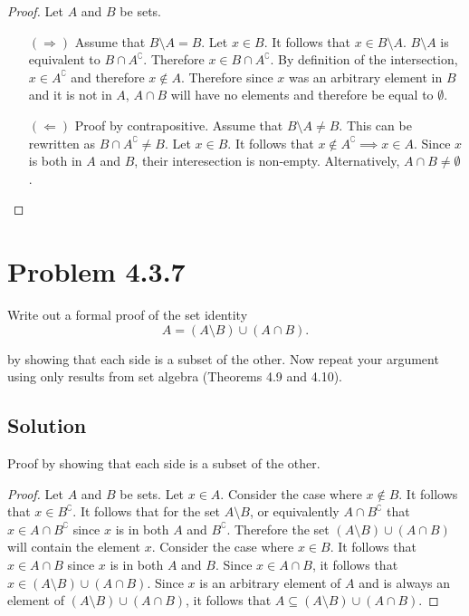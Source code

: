 \documentclass[12pt]{extarticle}
\begin{document}
\begin{proof}
	Let $A$ and $B$ be sets.
	\begin{enumerate}
		\item[$(\Rightarrow)$] 
			Assume that $B \setminus A = B$. Let $x \in B$. It follows that $x \in B \setminus A$. $B \setminus A$ is equivalent to $B \cap A^\complement$. Therefore $x \in B \cap A^\complement$. By definition of the intersection, $x \in A^\complement$ and therefore $x \notin A$. Therefore since $x$ was an arbitrary element in $B$ and it is not in $A$, $A \cap B$ will have no elements and therefore be equal to $\emptyset$. \hfill\qedsymbol
		\item[$(\Leftarrow)$] Proof by contrapositive. Assume that $B \setminus A \neq B$. This can be rewritten as $B \cap A^\complement \neq B$. Let $x \in B$. It follows that $x \notin A^\complement \implies x \in A$. Since $x$ is both in $A$ and $B$, their interesection is non-empty. Alternatively, $A \cap B \neq \emptyset$. \hfill\qedsymbol
	\end{enumerate}
	\renewcommand{\qedsymbol}{}
\end{proof}

\section*{Problem 4.3.7}

Write out a formal proof of the set identity 
\[
	A = (A \setminus B) \cup (A \cap B)
.\]

by showing that each side is a subset of the other. Now repeat your argument using only results from set algebra (Theorems 4.9 and 4.10).

\subsection*{Solution}
Proof by showing that each side is a subset of the other.
\begin{proof}
	Let $A$ and $B$ be sets. Let $x \in A$. Consider the case where $x \notin B$. It follows that $x \in B^\complement$. It follows that for the set $A \setminus B$, or equivalently $A \cap B^\complement$ that $x \in A \cap B^\complement$ since $x$ is in both $A$ and $B^\complement$. Therefore the set $(A \setminus B) \cup (A \cap B)$ will contain the element $x$. Consider the case where $x \in B$. It follows that $x \in A \cap B$ since $x$ is in both $A$ and $B$. Since $x \in A\cap B$, it follows that $x \in (A \setminus B) \cup (A \cap B)$. Since $x$ is an arbitrary element of $A$ and is always an element of $(A\setminus B) \cup (A \cap B)$, it follows that $A \subseteq (A \setminus B) \cup (A \cap B)$.
\end{proof}
\end{document}
